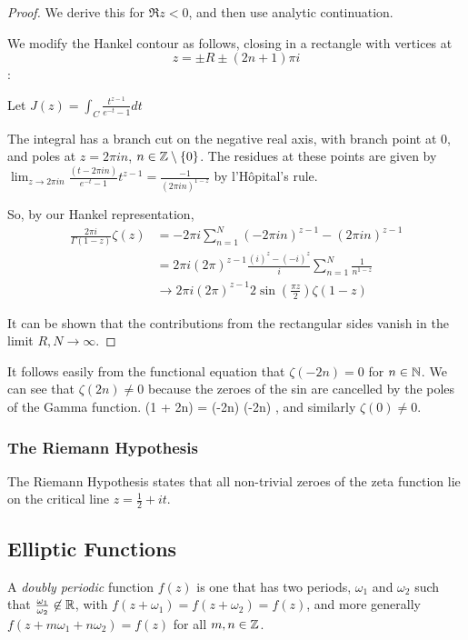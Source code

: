 \documentclass[a4paper]{article}
\begin{document}
\begin{proof}
	We derive this for $\Re z < 0$, and then use analytic continuation.

	We modify the Hankel contour as follows, closing in a rectangle with vertices at \[z = \pm R \pm (2n + 1) \pi i\]:
\begin{figure}[H]
    \centering
\end{figure}

Let $J(z) = \int_{C} \frac{t^{z-1}}{e^{-t} -1} dt$

The integral has a branch cut on the negative real axis, with branch point at $0$, and poles at $z = 2\pi i n$, $n \in \mathbb{Z}\setminus \{0\} $. The residues at these points are given by $\lim_{z\to 2\pi i n} \frac{(t-2\pi i n)}{e^{-t} - 1} t^{z-1} = \frac{-1}{(2\pi i n)^{1-z}}$ by l'H\^{o}pital's rule. 

So, by our Hankel representation, 
\begin{align*}
	\frac{2\pi i}{\Gamma(1-z)} \zeta(z) &= -2\pi i \sum_{n=1}^{N} (-2\pi i n)^{z-1} - (2\pi i n)^{z-1} \\
	&= 2\pi i (2\pi)^{z-1} \frac{(i)^{z} - (-i)^{z}}{i} \sum_{n=1}^{N} \frac{1}{n^{1-z}} \\
	&\to 2\pi i (2\pi)^{z-1} 2\sin\left( \frac{\pi z}{2} \right) \zeta(1-z)
\end{align*} 

It can be shown that the contributions from the rectangular sides vanish in the limit $R, N \to \infty$.
\end{proof}

It follows easily from the functional equation that $\zeta(-2n) = 0$ for  $n \in \mathbb{N}$. We can see that $\zeta(2n) \neq 0$ because the zeroes of the sin are cancelled by the poles of the Gamma function. 
\zeta(1 + 2n) = \Gamma(-2n) \zeta(-2n) , and similarly $\zeta(0) \neq 0$.

\subsubsection*{The Riemann Hypothesis}

The Riemann Hypothesis states that all non-trivial zeroes of the zeta function lie on the critical line $z = \frac{1}{2} + it$.

\subsection{Elliptic Functions}

\begin{defn}
	A \textit{doubly periodic} function $f(z)$ is one that has two periods, $\omega_1$ and $\omega_2$ such that $\frac{\omega_1}{\omega_2} \not\in \mathbb{R}$, with $f(z + \omega_1) = f(z + \omega_2) = f(z)$, and more generally $f(z + m\omega_1 + n\omega_2) = f(z)$ for all $m,n \in \mathbb{Z}$.
\end{defn}
\end{document}
